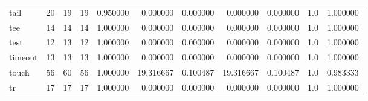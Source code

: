 \begin{longtable}{lrrrrrrrrrr}
tail      &                                      20 &                 19 &                                19 &                                   0.950000 &                               0.000000 &                                     0.000000 &                          0.000000 &                                0.000000 &                                1.0 &                                           1.000000 \\
tee       &                                      14 &                 14 &                                14 &                                   1.000000 &                               0.000000 &                                     0.000000 &                          0.000000 &                                0.000000 &                                1.0 &                                           1.000000 \\
test      &                                      12 &                 13 &                                12 &                                   1.000000 &                               0.000000 &                                     0.000000 &                          0.000000 &                                0.000000 &                                1.0 &                                           1.000000 \\
timeout   &                                      13 &                 13 &                                13 &                                   1.000000 &                               0.000000 &                                     0.000000 &                          0.000000 &                                0.000000 &                                1.0 &                                           1.000000 \\
touch     &                                      56 &                 60 &                                56 &                                   1.000000 &                              19.316667 &                                     0.100487 &                         19.316667 &                                0.100487 &                                1.0 &                                           0.983333 \\
tr        &                                      17 &                 17 &                                17 &                                   1.000000 &                               0.000000 &                                     0.000000 &                          0.000000 &                                0.000000 &                                1.0 &                                           1.000000 \\

\end{longtable}
